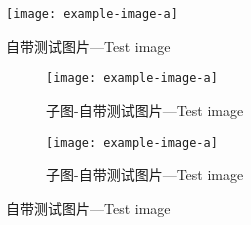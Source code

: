 \begin{figure}[htb]
  \centering
  \texttt{[image: example-image-a]}
  \caption{自带测试图片---Test image}\label{F:test-a}
\end{figure}

\begin{figure}[htb]
  \centering
  \begin{subfigure}[t]{.45\linewidth}
    \centering
    \texttt{[image: example-image-a]}
    \caption{子图-自带测试图片---Test image}\label{F:test-b-sub-a}
  \end{subfigure}
  \begin{subfigure}[t]{.45\linewidth}
    \centering
    \texttt{[image: example-image-a]}
    \caption{子图-自带测试图片---Test image}\label{F:test-b-sub-b}
  \end{subfigure}
  \caption{自带测试图片---Test image}\label{F:test-b}
\end{figure}
